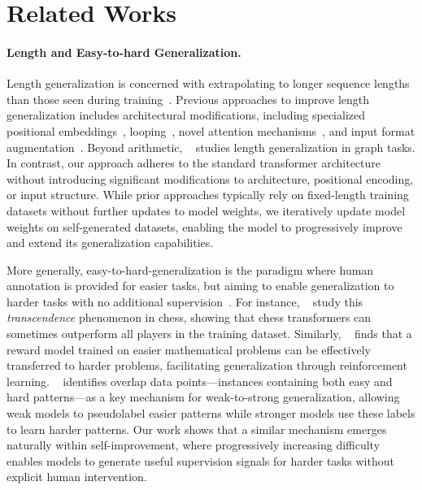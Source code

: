 \section{Related Works}\label{sec:related_work}

\paragraph{Length and Easy-to-hard Generalization.} 

Length generalization is concerned with extrapolating to longer sequence lengths than those seen during training~\citep{dubois2019location,hupkes2020compositionality,newman2020eos,anil2022exploring}. Previous approaches to improve length generalization includes architectural modifications, including specialized positional embeddings~\citep{press2021train,li2023functional,ruoss2023randomized,kazemnejad2024impact,sabbaghi2024explicitly,Cho2024PositionCI,zhou2024transformers}, looping~\cite{fan2024looped}, novel attention mechanisms~\citep{duan2023interpolation}, and input format augmentation~\citep{zhou2023algorithms,zhou2024transformers}. Beyond arithmetic, ~\citet{yehudai2021local} studies length generalization in graph tasks. In contrast, our approach adheres to the standard transformer architecture without introducing significant modifications to architecture, positional encoding, or input structure. While prior approaches typically rely on fixed-length training datasets without further updates to model weights, we iteratively update model weights on self-generated datasets, enabling the model to progressively improve and extend its generalization capabilities. 

More generally, easy-to-hard-generalization is the paradigm where human annotation is provided for easier tasks, but aiming to enable generalization to harder tasks with no additional supervision~\citep{schwarzschild2021can,bansal2022end,burns2023weak,hase2024unreasonable,sun2024easy}. 
For instance, ~\citet{zhang2024transcendence} study this \textit{transcendence} phenomenon in chess, showing that chess transformers can sometimes outperform all players in the training dataset. Similarly, ~\citet{sun2024easy} finds that a reward model trained on easier mathematical problems can be effectively transferred to harder problems, facilitating generalization through reinforcement learning. ~\citet{shin2024weak} identifies overlap data points—instances containing both easy and hard patterns—as a key mechanism for weak-to-strong generalization, allowing weak models to pseudolabel easier patterns while stronger models use these labels to learn harder patterns. Our work shows that a similar mechanism emerges naturally within self-improvement, where progressively increasing difficulty enables models to generate useful supervision signals for harder tasks without explicit human intervention.














